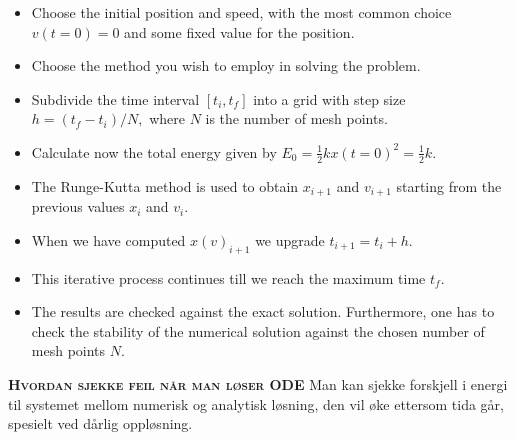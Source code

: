 \documentclass[12pt,a4paper,twocolumn]{article}
\begin{document}
\begin{flushleft}
\begin{itemize}
  \item Choose the initial position and speed, with the most common choice \( v(t=0)=0 \) and some fixed value for the position.
 \item Choose the method you wish to employ in solving the problem.
 \item Subdivide the time interval \( [t_i,t_f]  \) into a grid with step size $h=(t_f-t_i)/N, $ where \( N \) is the number of mesh points.
 \item Calculate now the total energy given by $E_0=\frac{1}{2}kx(t=0)^2=\frac{1}{2}k.$
 \item The Runge-Kutta method is used to obtain \( x_{i+1} \) and \( v_{i+1} \) starting from the previous values \( x_i \) and \( v_i \).
 \item When we have computed \( x(v)_{i+1} \) we upgrade  \( t_{i+1}=t_i+h \).
 \item This iterative  process continues till we reach the maximum time \( t_f \).
 \item The results are checked against the exact solution. Furthermore, one has to check the stability of the numerical solution against the chosen number of mesh points \( N \).
\end{itemize}
\textbf{\textsc{Hvordan sjekke feil når man løser ODE}} Man kan sjekke forskjell i energi til systemet mellom numerisk og analytisk løsning, den vil øke ettersom tida går, spesielt ved dårlig oppløsning.


\end{flushleft}
\end{document}
